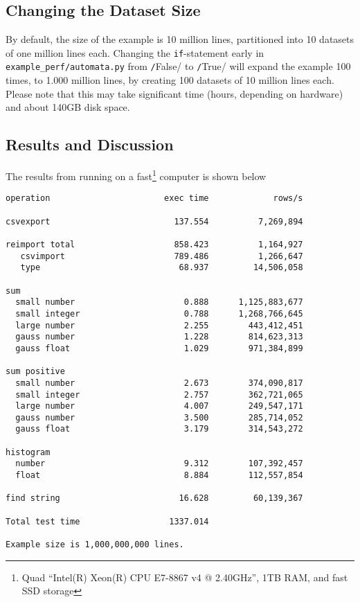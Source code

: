 \documentclass[a4paper]{article}
\newcommand{\pyTrue}{\texttt/True/\xspace}
\newcommand{\pyFalse}{\texttt/False/\xspace}
\begin{document}
\subsection*{Changing the Dataset Size}
By default, the size of the example is 10 million lines, partitioned
into 10 datasets of one million lines each.  Changing the
\texttt{if}-statement early in \texttt{example\_perf/automata.py} from
\pyFalse to \pyTrue will expand the example 100 times, to 1.000
million lines, by creating 100 datasets of 10 million lines each.
Please note that this may take significant time (hours, depending on
hardware) and about 140GB disk space.



\clearpage
\subsection*{Results and Discussion}
The results from running on a fast\footnote{Quad ``Intel(R) Xeon(R)
  CPU E7-8867 v4 @ 2.40GHz'', 1TB RAM, and fast SSD storage} computer
is shown below
\begin{snugshade}
\begin{verbatim}
operation                       exec time             rows/s

csvexport                         137.554          7,269,894

reimport total                    858.423          1,164,927
   csvimport                      789.486          1,266,647
   type                            68.937         14,506,058

sum
  small number                      0.888      1,125,883,677
  small integer                     0.788      1,268,766,645
  large number                      2.255        443,412,451
  gauss number                      1.228        814,623,313
  gauss float                       1.029        971,384,899

sum positive
  small number                      2.673        374,090,817
  small integer                     2.757        362,721,065
  large number                      4.007        249,547,171
  gauss number                      3.500        285,714,052
  gauss float                       3.179        314,543,272

histogram
  number                            9.312        107,392,457
  float                             8.884        112,557,854

find string                        16.628         60,139,367

Total test time                  1337.014

Example size is 1,000,000,000 lines.
\end{verbatim}
\end{snugshade}
\end{document}
